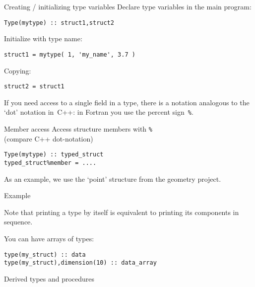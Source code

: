 \begin{block}{Creating / initializing type variables}
  \label{sl:ftype-set}
  Declare type variables in the main program:
\begin{lstlisting}
Type(mytype) :: struct1,struct2
\end{lstlisting}
 Initialize with type name:
\begin{lstlisting}
struct1 = mytype( 1, 'my_name', 3.7 )
\end{lstlisting}
Copying:
\begin{lstlisting}
struct2 = struct1
\end{lstlisting}
\end{block}

If you need access to a single field in a type, 
there is a notation analogous to the `dot' notation in~C++:
in Fortran you use the percent sign~\verb+%+.

\begin{block}{Member access}
  \label{sl:ftype-access}
  Access structure members with \verb+%+\\
  (compare C++ dot-notation)
\begin{lstlisting}
Type(mytype) :: typed_struct
typed_struct%member = ....  
\end{lstlisting}
\end{block}

As an example, we use the `point' structure
from the geometry project.

\begin{block}{Example}
  \label{sl:ftype-ex}
  \begin{multicols}{2}
    \columnbreak
  \end{multicols}
\end{block}

Note that printing a type by itself is equivalent to printing
its components in sequence.

You can have arrays of types:
\begin{lstlisting}
type(my_struct) :: data
type(my_struct),dimension(10) :: data_array
\end{lstlisting}

 {Derived types and procedures}

